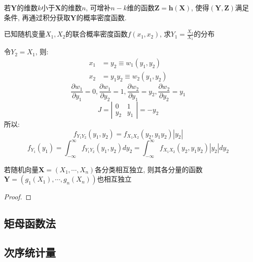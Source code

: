 \begin{remark}
    若$\mathbf{Y}$的维数$k$小于$\mathbf{X}$的维数$n$, 可增补$n-k$维的函数$\mathbf{Z}=\mathbf{h}(\mathbf{X})$, 使得$(\mathbf{Y},\mathbf{Z})$满足条件, 再通过积分获取$\mathbf{Y}$的概率密度函数.
\end{remark}

\begin{example}
    已知随机变量$X_1,X_2$的联合概率密度函数$f(x_1,x_2)$, 求$Y_1=\frac{X_2}{X_1}$的分布
\end{example}

\begin{solution}
    令$Y_{2}=X_{1}$, 则:
    \begin{align*}
        x_{1} & =y_{2}\equiv w_{1}(y_{1}, y_{2})       \\
        x_{2} & =y_{1} y_{2}\equiv w_{2}(y_{1}, y_{2})
    \end{align*}
    \[ \frac{\partial w_{1}}{\partial y_{1}}=0, \frac{\partial w_{1}}{\partial y_{2}}=1, \frac{\partial w_{2}}{\partial y_{1}}=y_{2}, \frac{\partial w_{2}}{\partial y_{2}}=y_{1}\]
    \[ J=\left|\begin{array}{cc}0 & 1 \\ y_{2} & y_{1}\end{array}\right|=-y_{2}\]
    所以:
    \[ f_{Y_1 Y_2}(y_1, y_2)=f_{X_1 X_2}(y_{2}, y_{1} y_{2})\left|y_2\right| \]
    \[ f_{Y_1}(y_1)=\int_{-\infty}^{\infty} f_{Y_{1} Y_{2}}\left(y_{1}, y_{2}\right) d y_{2}=\int_{-\infty}^{\infty} f_{X_{1} X_{2}}\left(y_{2}, y_{1} y_{2}\right)\left|y_{2}\right| d y_{2} \]
\end{solution}

\begin{proposition}
    若随机向量$\mathbf{X}=(X_1,\cdots ,X_n)$各分类相互独立, 则其各分量的函数$\mathbf{Y}=(g_1(X_1),\cdots ,g_n(X_n))$也相互独立
\end{proposition}
\begin{proof}

\end{proof}

\subsection{矩母函数法}

\subsection{次序统计量}

